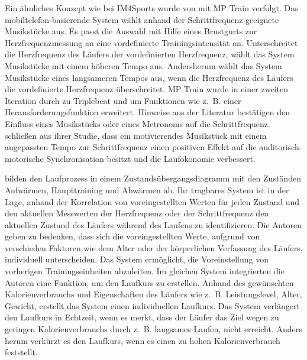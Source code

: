 Ein ähnliches Konzept wie bei IM4Sports wurde von \citet[][]{Oliver2006} mit MP Train verfolgt. Das mobiltelefon-basierende System wählt anhand der Schrittfrequenz geeignete Musikstücke aus. Es passt die Auswahl mit Hilfe eines Brustgurts zur Herzfrequenzmessung an eine vordefinierte Trainingsintensität an. Unterschreitet die Herzfrequenz des Läufers der vordefinierten Herzfrequenz, wählt das System Musikstücke mit einem höheren Tempo aus. Andersherum wählt das System Musikstücke eines langsameren Tempos aus, wenn die Herzfrequenz des Läufers die vordefinierte Herzfrequenz überschreitet. MP Train wurde in einer zweiten Iteration durch \citet[][]{DeOliveira2008} zu Triplebeat und um Funktionen wie z.~B. einer Herausforderungsfunktion erweitert. Hinweise aus der Literatur \citep[][]{Bood2013} bestätigen den Einfluss eines Musikstücks oder eines Metronoms auf die Schrittfrequenz. \citet[][]{Bood2013} schließen aus ihrer Studie, dass ein motivierendes Musikstück mit einem angepassten Tempo zur Schrittfrequenz einen positiven Effekt auf die auditorisch-motorische Synchronisation besitzt und die Laufökonomie verbessert.

\citet[][]{Takata2007} bilden den Laufprozess in einem Zustandsübergangsdiagramm mit den Zuständen Aufwärmen, Haupttraining und Abwärmen ab. Ihr tragbares System ist in der Lage, anhand der Korrelation von voreingestellten Werten für jeden Zustand und den aktuellen Messwerten der Herzfrequenz oder der Schrittfrequenz den aktuellen Zustand des Läufers während des Laufens zu identifizieren. Die Autoren geben zu bedenken, dass sich die voreingestellten Werte, aufgrund von verschieden Faktoren wie dem Alter oder der körperlichen Verfassung des Läufers, individuell unterscheiden. Das System ermöglicht, die Voreinstellung von vorherigen Trainingseinheiten abzuleiten. Im gleichen System integrierten die Autoren eine Funktion, um den Laufkurs zu erstellen. Anhand des gewünschten Kalorienverbrauchs und Eigenschaften des Läufers wie z.~B. Leistungslevel, Alter, Gewicht, erstellt das System einen individuellen Laufkurs. Das System verlängert den Laufkurs in Echtzeit, wenn es merkt, dass der Läufer das Ziel wegen zu geringen Kalorienverbrauchs durch z.~B. langsames Laufen, nicht erreicht. Anders herum verkürzt es den Laufkurs, wenn es einen zu hohen Kalorienverbrauch feststellt.

